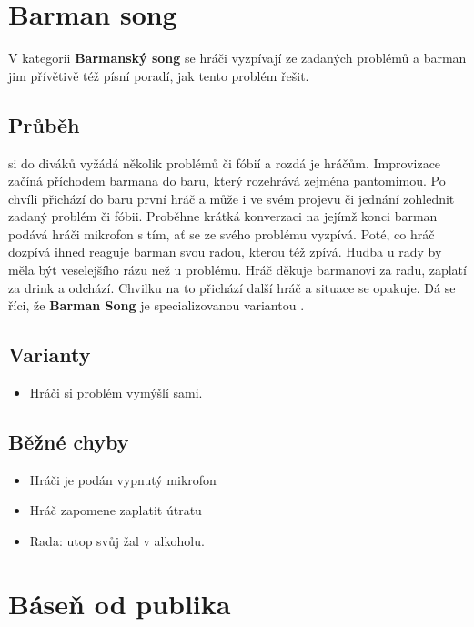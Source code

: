 \documentclass[main.tex]{subfiles}
\begin{document}
\needspace{5cm}

\section{Barman song} 
\label{barman song} 



V kategorii \textbf{Barmanský song}{} se hráči vyzpívají ze zadaných problémů a barman jim přívětivě též písní poradí, jak tento problém řešit.  
 
\subsection{ Průběh }  si do diváků vyžádá několik problémů či fóbií a rozdá je hráčům. Improvizace začíná příchodem barmana do baru, který rozehrává zejména pantomimou. Po chvíli přichází do baru první hráč a může i ve svém projevu či jednání zohlednit zadaný problém či fóbii. Proběhne krátká konverzaci na jejímž konci barman podává hráči mikrofon s tím, ať se ze svého problému vyzpívá. Poté, co hráč dozpívá ihned reaguje barman svou radou, kterou též zpívá. Hudba u rady by měla být veselejšího rázu než u problému. Hráč děkuje barmanovi za radu, zaplatí za drink a odchází. Chvilku na to přichází další hráč a situace se opakuje. 
Dá se říci, že \textbf{Barman Song}{} je specializovanou variantou . 
 
\subsection{ Varianty } \begin{itemize}
\item Hráči si problém vymýšlí sami.
\end{itemize}
 
 
\subsection{ Běžné chyby} \begin{itemize}
\item  Hráči je podán vypnutý mikrofon
\item  Hráč zapomene zaplatit útratu
\item  Rada: utop svůj žal v alkoholu.
\end{itemize}
 
 
 
  
  
 
\needspace{5cm}
\section{Báseň od publika}
\label{báseň od publika}
 
\end{document}
